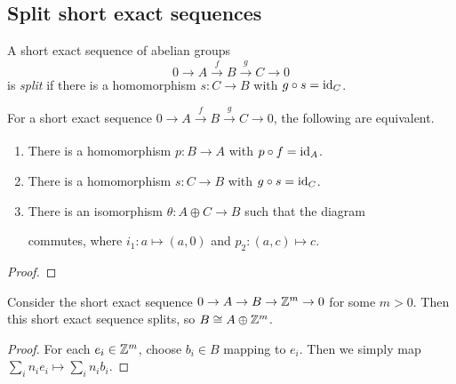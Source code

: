 \subsection{Split short exact sequences}

\begin{definition}
  A short exact sequence of abelian groups
  \[0 \to A \xrightarrow f B \xrightarrow g C \to 0\]
  is \emph{split} if there is a homomorphism $s: C \to B$ with $g \circ s = \operatorname{id}_C$.
\end{definition}

\begin{proposition}
  For a short exact sequence $0 \to A \xrightarrow[]{f} B \xrightarrow[]{g} C \to 0$, the following are equivalent.
  \begin{enumerate}
    \item There is a homomorphism $p: B \to A$ with $p \circ f = \operatorname{id}_A$.
    \item There is a homomorphism $s: C \to B$ with $g \circ s = \operatorname{id}_C$.
    \item There is an isomorphism $\theta: A \oplus C \to B$ such that the diagram
          \begin{center}
          \end{center}
          commutes, where $i_1: a \mapsto (a,0)$ and $p_2: (a,c) \mapsto c$.
  \end{enumerate}
\end{proposition}

\begin{proof}
\end{proof}

\begin{lemma}
  Consider the short exact sequence $0 \to A \to B \to \mathbb{Z}^m \to 0$ for some $m > 0$. Then this short exact sequence splits, so $B \cong A \oplus \mathbb{Z}^m$. 
\end{lemma}

\begin{proof}
  For each $e_i \in \mathbb{Z}^m$, choose $b_i \in B$ mapping to $e_i$. Then we simply map $\sum_i n_i e_i \mapsto \sum_i n_i b_i$.
\end{proof}